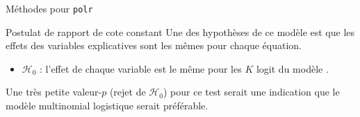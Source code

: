 \documentclass[
  ignorenonframetext,
]{beamer}
\newenvironment{Shaded}{\begin{snugshade}}{\end{snugshade}}
\newcommand{\CommentTok}[1]{\textcolor[rgb]{0.37,0.37,0.37}{#1}}
\newcommand{\FunctionTok}[1]{\textcolor[rgb]{0.28,0.35,0.67}{#1}}
\newcommand{\NormalTok}[1]{\textcolor[rgb]{0.00,0.23,0.31}{#1}}
\newcommand{\SpecialCharTok}[1]{\textcolor[rgb]{0.37,0.37,0.37}{#1}}
\providecommand{\tightlist}{%
  \setlength{\itemsep}{0pt}\setlength{\parskip}{0pt}}\usepackage{longtable,booktabs,array}
\begin{document}
\begin{frame}[fragile]{Méthodes pour \texttt{polr}}
\protect\hypertarget{muxe9thodes-pour-polr}{}
\begin{Shaded}
\end{Shaded}
\end{frame}

\begin{frame}{Postulat de rapport de cote constant}
\protect\hypertarget{postulat-de-rapport-de-cote-constant}{}
Une des hypothèses de ce modèle est que les effets des variables
explicatives sont les mêmes pour chaque équation.

\begin{itemize}
\tightlist
\item
  \(\mathscr{H}_0\) : l'effet de chaque variable est le même pour les
  \(K\) logit du modèle .
\end{itemize}

Une très petite valeur-\(p\) (rejet de \(\mathscr{H}_0\)) pour ce test
serait une indication que le modèle multinomial logistique serait
préférable.
\end{frame}
\end{document}
